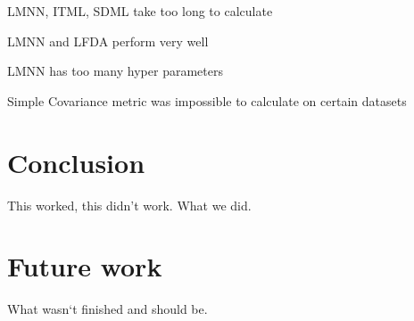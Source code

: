 \documentclass[12pt,a4paper]{report}
\let\openright=\clearpage
\begin{document}
LMNN, ITML, SDML take too long to calculate

LMNN and LFDA perform very well

LMNN has too many hyper parameters

Simple Covariance metric was impossible to calculate on certain datasets


\chapter*{Conclusion}

This worked, this didn't work. What we did.

\chapter*{Future work}

What wasn`t finished and should be.




\listoffigures

\listoftables



\openright
\end{document}
